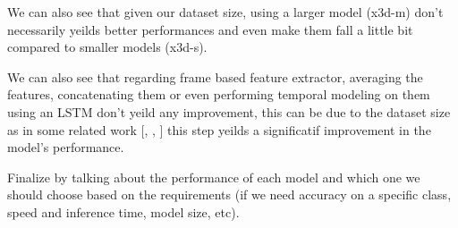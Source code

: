 We can also see that given our dataset size, using a larger model (x3d-m) don't necessarily yeilds better performances and even make them fall a little bit compared to smaller models (x3d-s).

We can also see that regarding frame based feature extractor, averaging the features, concatenating them or even performing temporal modeling on them using an LSTM don't yeild any improvement, this can be due to the dataset size as in some related work [\cite{example-paper-doing-temporal-modeling}, \cite{example-paper-doing-temporal-modeling}, \cite{example-paper-doing-temporal-modeling}] this step yeilds a significatif improvement in the model's performance.

Finalize by talking about the performance of each model and which one we should choose based on the requirements (if we need accuracy on a specific class, speed and inference time, model size, etc).

